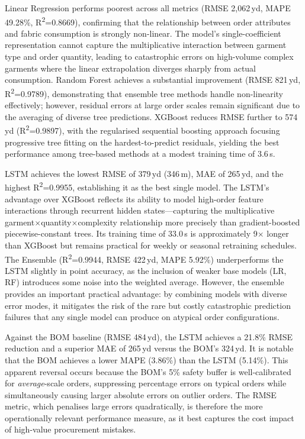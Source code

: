 Linear Regression performs poorest across all metrics (RMSE 2{,}062\,yd, MAPE 49.28\%, R\textsuperscript{2}=0.8669), confirming that the relationship between order attributes and fabric consumption is strongly non-linear. The model's single-coefficient representation cannot capture the multiplicative interaction between garment type and order quantity, leading to catastrophic errors on high-volume complex garments where the linear extrapolation diverges sharply from actual consumption. Random Forest achieves a substantial improvement (RMSE 821\,yd, R\textsuperscript{2}=0.9789), demonstrating that ensemble tree methods handle non-linearity effectively; however, residual errors at large order scales remain significant due to the averaging of diverse tree predictions. XGBoost reduces RMSE further to 574\,yd (R\textsuperscript{2}=0.9897), with the regularised sequential boosting approach focusing progressive tree fitting on the hardest-to-predict residuals, yielding the best performance among tree-based methods at a modest training time of 3.6\,s.

LSTM achieves the lowest RMSE of 379\,yd (346\,m), MAE of 265\,yd, and the highest R\textsuperscript{2}=0.9955, establishing it as the best single model. The LSTM's advantage over XGBoost reflects its ability to model high-order feature interactions through recurrent hidden states---capturing the multiplicative garment$\times$quantity$\times$complexity relationship more precisely than gradient-boosted piecewise-constant trees. Its training time of 33.0\,s is approximately 9$\times$ longer than XGBoost but remains practical for weekly or seasonal retraining schedules. The Ensemble (R\textsuperscript{2}=0.9944, RMSE 422\,yd, MAPE 5.92\%) underperforms the LSTM slightly in point accuracy, as the inclusion of weaker base models (LR, RF) introduces some noise into the weighted average. However, the ensemble provides an important practical advantage: by combining models with diverse error modes, it mitigates the risk of the rare but costly catastrophic prediction failures that any single model can produce on atypical order configurations.

Against the BOM baseline (RMSE 484\,yd), the LSTM achieves a 21.8\% RMSE reduction and a superior MAE of 265\,yd versus the BOM's 324\,yd. It is notable that the BOM achieves a lower MAPE (3.86\%) than the LSTM (5.14\%). This apparent reversal occurs because the BOM's 5\% safety buffer is well-calibrated for \textit{average}-scale orders, suppressing percentage errors on typical orders while simultaneously causing larger absolute errors on outlier orders. The RMSE metric, which penalises large errors quadratically, is therefore the more operationally relevant performance measure, as it best captures the cost impact of high-value procurement mistakes.

